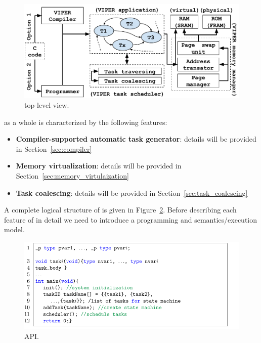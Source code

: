 \begin{figure}
	\centering
	\includegraphics[width=\columnwidth]{figures/viper_block_diagram.pdf}
	\caption{\sys top-level view.}
	\label{fig:system_overview}
\end{figure}

\sys as a whole is characterized by the following features:

\begin{itemize}
	\item \textbf{Compiler-supported automatic task generator}: details will be provided in Section~\ref{sec:compiler}
	\item \textbf{Memory virtualization}: details will be provided in Section~\ref{sec:memory_virtulaization}
	\item \textbf{Task coalescing}: details will be provided in Section~\ref{sec:task_coalescing}
\end{itemize}

A complete logical structure of \sys is given in Figure~\ref{fig:system_overview}. Before describing each feature of \sys in detail we need to introduce a programming and semantics/execution model.

\begin{figure}
	\centering
	\includegraphics[width=\columnwidth]{figures/taskification_example}
	\caption{\sys API.}
	\label{fig:system_overview}
\end{figure}



